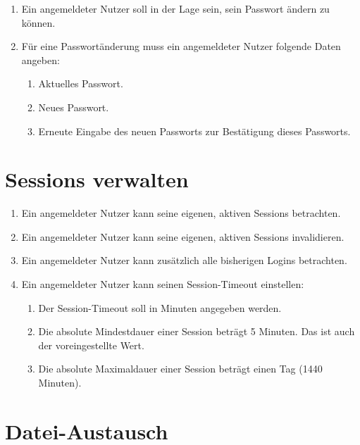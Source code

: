 \documentclass[12pt,DIV14,BCOR10mm,a4paper,parskip=half-,headsepline,headinclude,english,ngerman,bibliography=totocnumbered]{scrreprt}
\begin{document}
\begin{enumerate}
    \item Ein angemeldeter Nutzer soll in der Lage sein, sein Passwort ändern zu können.
    \item Für eine Passwortänderung muss ein angemeldeter Nutzer folgende Daten angeben:
    \begin{enumerate}
        \item Aktuelles Passwort.
        \item Neues Passwort.
        \item Erneute Eingabe des neuen Passworts zur Bestätigung dieses Passworts.
    \end{enumerate}
\end{enumerate}

\chapter{Sessions verwalten}

\begin{enumerate}
    \item Ein angemeldeter Nutzer kann seine eigenen, aktiven Sessions betrachten.
    \item Ein angemeldeter Nutzer kann seine eigenen, aktiven Sessions invalidieren.
    \item Ein angemeldeter Nutzer kann zusätzlich alle bisherigen Logins betrachten.
    \item Ein angemeldeter Nutzer kann seinen Session-Timeout einstellen:
    \begin{enumerate}
        \item Der Session-Timeout soll in Minuten angegeben werden.
        \item Die absolute Mindestdauer einer Session beträgt 5 Minuten. Das ist auch der voreingestellte Wert.
        \item Die absolute Maximaldauer einer Session beträgt einen Tag (1440 Minuten).
    \end{enumerate}
\end{enumerate}

\chapter{Datei-Austausch}
\end{document}

